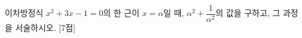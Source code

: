 이차방정식 $x^2+3x-1=0$의 한 근이 $x=\alpha$일 때, $\alpha^2+\dfrac{1}{\alpha^2}$의 값을 구하고, 그 과정을 서술하시오. \mbox{[7점]}
